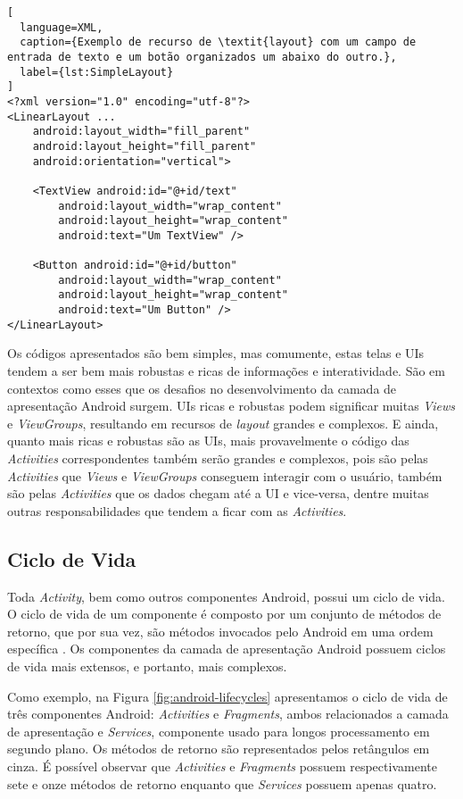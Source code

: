 \begin{lstlisting}[
  language=XML, 
  caption={Exemplo de recurso de \textit{layout} com um campo de entrada de texto e um botão organizados um abaixo do outro.}, 
  label={lst:SimpleLayout}
]
<?xml version="1.0" encoding="utf-8"?>
<LinearLayout ...
    android:layout_width="fill_parent"
    android:layout_height="fill_parent"
    android:orientation="vertical">

    <TextView android:id="@+id/text"
        android:layout_width="wrap_content"
        android:layout_height="wrap_content"
        android:text="Um TextView" />

    <Button android:id="@+id/button"
        android:layout_width="wrap_content"
        android:layout_height="wrap_content"
        android:text="Um Button" />
</LinearLayout>
\end{lstlisting}

Os códigos apresentados são bem simples, mas comumente, estas telas e \acs{UI}s tendem a ser bem mais robustas e ricas de informações e interatividade. São em contextos como esses que os desafios no desenvolvimento da camada de apresentação Android surgem. \acs{UI}s ricas e robustas podem significar muitas \textit{Views} e \textit{ViewGroups}, resultando em recursos de \textit{layout} grandes e complexos. E ainda, quanto mais ricas e robustas são as \acs{UI}s, mais provavelmente o código das \textit{Activities} correspondentes também serão grandes e complexos, pois são pelas \textit{Activities} que \textit{Views} e \textit{ViewGroups} conseguem interagir com o usuário, também são pelas \textit{Activities} que os dados chegam até a \acs{UI} e vice-versa, dentre muitas outras responsabilidades que tendem a ficar com as \textit{Activities}.

\subsection{Ciclo de Vida}

Toda \textit{Activity}, bem como outros componentes Android, possui um ciclo de vida. O ciclo de vida de um componente é composto por um conjunto de métodos de retorno, que por sua vez, são métodos invocados pelo Android em uma ordem específica \cite{AndroidActivities2016}. Os componentes da camada de apresentação Android possuem ciclos de vida mais extensos, e portanto, mais complexos. 

Como exemplo, na Figura \ref{fig:android-lifecycles} apresentamos o ciclo de vida de três componentes Android: \textit{Activities} e \textit{Fragments}, ambos relacionados a camada de apresentação e \textit{Services}, componente usado para longos processamento em segundo plano. Os métodos de retorno são representados pelos retângulos em cinza. É possível observar que \textit{Activities} e \textit{Fragments} possuem respectivamente sete e onze métodos de retorno enquanto que \textit{Services} possuem apenas quatro.


